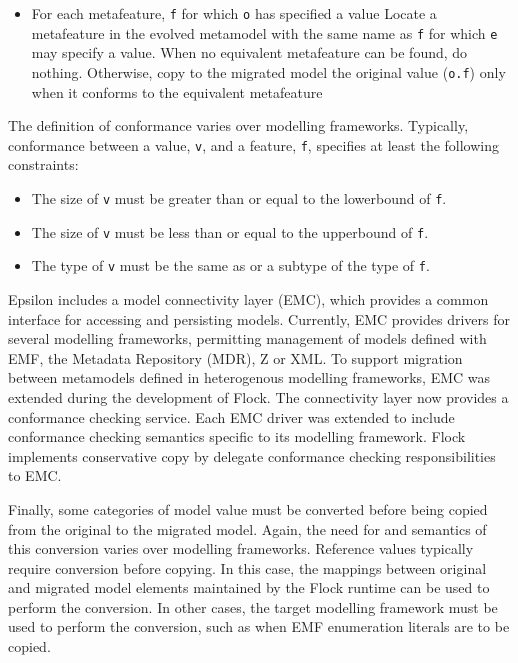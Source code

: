 \begin{itemize}
	\item For each metafeature, \texttt{f} for which \texttt{o} has specified a value
		\subitem Locate a metafeature in the evolved metamodel with the same name as \texttt{f} for which \texttt{e} may specify a value.
			\subsubitem When no equivalent metafeature can be found, do nothing.
			\subsubitem Otherwise, copy to the migrated model the original value (\texttt{o.f}) only when it conforms to the equivalent metafeature
\end{itemize}

The definition of conformance varies over modelling frameworks. Typically, conformance between a value, \texttt{v}, and a feature, \texttt{f}, specifies at least the following constraints:

\begin{itemize}
	\item The size of \texttt{v} must be greater than or equal to the lowerbound of \texttt{f}.
	\item The size of \texttt{v} must be less than or equal to the upperbound of \texttt{f}.
	\item The type of \texttt{v} must be the same as or a subtype of the type of \texttt{f}.
\end{itemize}


Epsilon includes a model connectivity layer (EMC), which provides a common interface for accessing and persisting models. Currently, EMC provides drivers for several modelling frameworks, permitting management of models defined with EMF, the Metadata Repository (MDR), Z or XML. To support migration between metamodels defined in heterogenous modelling frameworks, EMC was extended during the development of Flock. The connectivity layer now provides a conformance checking service. Each EMC driver was extended to include conformance checking semantics specific to its modelling framework. Flock implements conservative copy by delegate conformance checking responsibilities to EMC. 

Finally, some categories of model value must be converted before being copied from the original to the migrated model. Again, the need for and semantics of this conversion varies over modelling frameworks. Reference values typically require conversion before copying. In this case, the mappings between original and migrated model elements maintained by the Flock runtime can be used to perform the conversion. In other cases, the target modelling framework must be used to perform the conversion, such as when EMF enumeration literals are to be copied.

